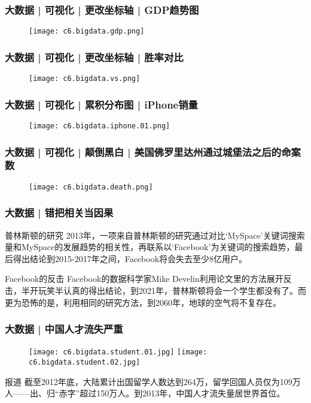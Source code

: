 \begin{frame}
  \frametitle{大数据 | 可视化 | 更改坐标轴 | GDP趋势图}
  \begin{figure}
    \centering
    \texttt{[image: c6.bigdata.gdp.png]}
  \end{figure}
\end{frame}

\begin{frame}
  \frametitle{大数据 | 可视化 | 更改坐标轴 | 胜率对比}
  \begin{figure}
    \centering
    \texttt{[image: c6.bigdata.vs.png]}
  \end{figure}
\end{frame}

\begin{frame}
  \frametitle{大数据 | 可视化 | 累积分布图 | iPhone销量}
  \begin{figure}
    \centering
    \texttt{[image: c6.bigdata.iphone.01.png]}
  \end{figure}
\end{frame}

\begin{frame}
  \frametitle{大数据 | 可视化 | 颠倒黑白 | 美国佛罗里达州通过城堡法之后的命案数}
  \begin{figure}
    \centering
    \texttt{[image: c6.bigdata.death.png]}
  \end{figure}
\end{frame}

\begin{frame}
  \frametitle{大数据 | 错把相关当因果}
  \begin{block}{普林斯顿的研究}
    2013年，一项来自普林斯顿的研究通过对比`MySpace'关键词搜索量和MySpace的发展趋势的相关性，再联系以`Facebook'为关键词的搜索趋势，最后得出结论到2015-2017年之间，Facebook将会失去至少8亿用户。
  \end{block}
  \pause
  \begin{block}{Facebook的反击}
    Facebook的数据科学家Mike Develin利用论文里的方法展开反击，半开玩笑半认真的得出结论，到2021年，普林斯顿将会一个学生都没有了。而更为恐怖的是，利用相同的研究方法，到2060年，地球的空气将不复存在。
  \end{block}
\end{frame}

\begin{frame}
  \frametitle{大数据 | 中国人才流失严重}
  \begin{figure}
    \centering
    \texttt{[image: c6.bigdata.student.01.jpg]}
    \texttt{[image: c6.bigdata.student.02.jpg]}
  \end{figure}
  \begin{block}{报道}
    截至2012年底，大陆累计出国留学人数达到264万，留学回国人员仅为109万人——出、归“赤字”超过150万人。到2013年，中国人才流失量居世界首位。
  \end{block}
\end{frame}

